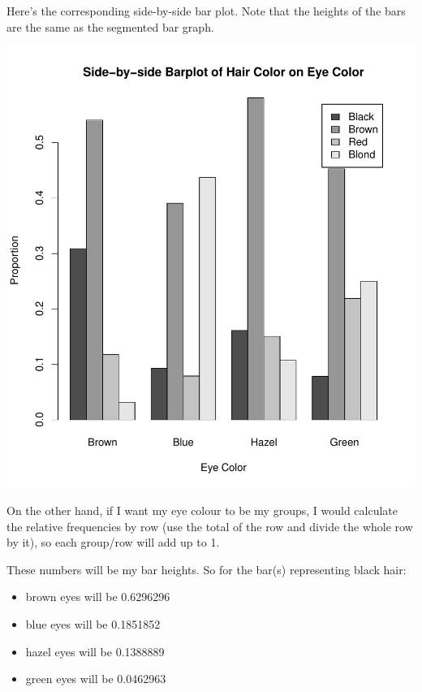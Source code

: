 \documentclass[
]{book}
\begin{document}
Here's the corresponding side-by-side bar plot. Note that the heights of
the bars are the same as the segmented bar graph.

\includegraphics{_main_files/figure-latex/unnamed-chunk-10-1.pdf}

On the other hand, if I want my eye colour to be my groups, I would
calculate the relative frequencies by row (use the total of the row and
divide the whole row by it), so each group/row will add up to 1.

These numbers will be my bar heights. So for the bar(s) representing
black hair:

\begin{itemize}
\item
  brown eyes will be 0.6296296
\item
  blue eyes will be 0.1851852
\item
  hazel eyes will be 0.1388889
\item
  green eyes will be 0.0462963
\end{itemize}
\end{document}
